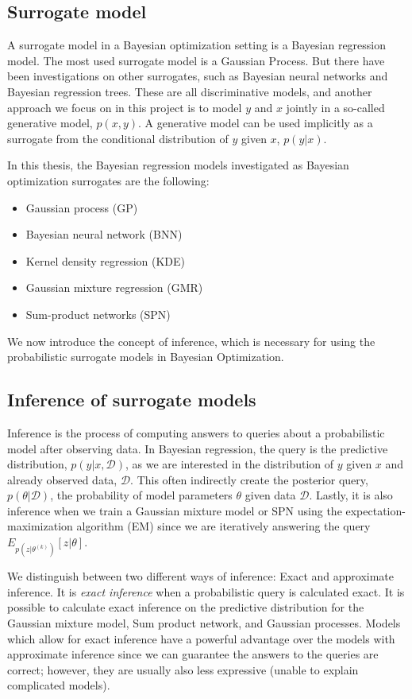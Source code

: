 \subsection{Surrogate model}
A surrogate model in a Bayesian optimization setting is a Bayesian regression model. The most
used surrogate model is a Gaussian Process. But there have been investigations on other 
surrogates, such as Bayesian neural networks and Bayesian regression trees. These are all
discriminative models, and another approach we focus on in this project is to model $y$ and
$x$ jointly in a so-called generative model, $p(x,y)$. A generative model can be used implicitly
as a surrogate from the conditional distribution of $y$ given $x$, $p(y|x)$.

In this thesis, the Bayesian regression models investigated as Bayesian optimization surrogates are
the following:
\begin{itemize}[noitemsep]
    \item Gaussian process (GP)
    \item Bayesian neural network (BNN)
    \item Kernel density regression (KDE)
    \item Gaussian mixture regression (GMR)
    \item Sum-product networks (SPN)
\end{itemize}

We now introduce the concept of inference, which is necessary for using the probabilistic surrogate models
in Bayesian Optimization. 

\subsection{Inference of surrogate models}
Inference is the process of computing answers to queries about a probabilistic model after observing
data. In Bayesian regression, the query is the predictive distribution, $p(y|x,\mathcal{D})$, as we
are interested in the distribution of $y$ given $x$ and already observed data, $\mathcal{D}$. This
often indirectly create the posterior query, $p(\theta|\mathcal{D})$, the probability of model
parameters $\theta$ given data $\mathcal{D}$. Lastly, it is also inference when we train a Gaussian
mixture model or SPN using the expectation-maximization algorithm (EM) since we are iteratively
answering the query $E_{p(z|\theta^{(k)})}[z|\theta]$.

We distinguish between two different ways of inference: Exact and approximate inference. It is
\textit{exact inference} when a probabilistic query is calculated exact. It is possible to
calculate exact inference on the predictive distribution for the Gaussian mixture model, Sum product
network, and Gaussian processes. Models which allow for exact inference have a powerful advantage
over the models with approximate inference since we can guarantee the answers to the queries are
correct; however, they are usually also less expressive (unable to explain complicated models). 

